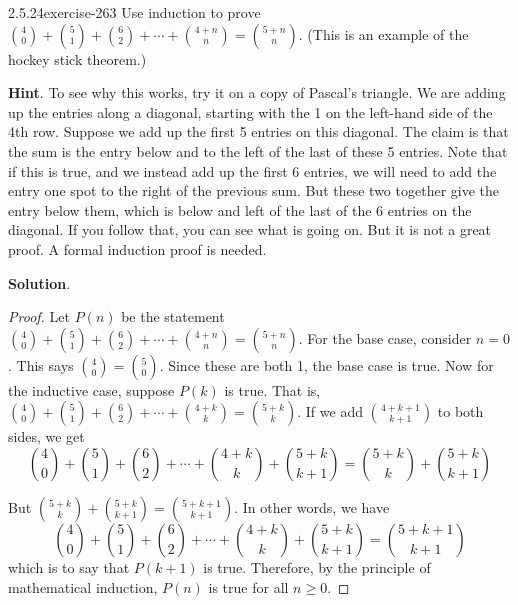 \documentclass[twoside,11pt,]{book}
\numberwithin{equation}{chapter}
\begin{document}
\begin{divisionsolution}{2.5.24}{}{exercise-263}%
\hypertarget{p-3685}{}%
Use induction to prove \({4 \choose 0} + {5 \choose 1} + {6 \choose 2} + \cdots + {4+n \choose n} = {5+n \choose n}\). (This is an example of the hockey stick theorem.)%
\par\smallskip%
\noindent\textbf{Hint}.\quad%
\hypertarget{p-3686}{}%
To see why this works, try it on a copy of Pascal's triangle. We are adding up the entries along a diagonal, starting with the 1 on the left-hand side of the 4th row. Suppose we add up the first 5 entries on this diagonal. The claim is that the sum is the entry below and to the left of the last of these 5 entries. Note that if this is true, and we instead add up the first 6 entries, we will need to add the entry one spot to the right of the previous sum. But these two together give the entry below them, which is below and left of the last of the 6 entries on the diagonal. If you follow that, you can see what is going on. But it is not a great proof. A formal induction proof is needed.%
\par\smallskip%
\noindent\textbf{Solution}.\quad%
\begin{proof}{}
\hypertarget{p-3687}{}%
Let \(P(n)\) be the statement \({4 \choose 0} + {5 \choose 1} + {6 \choose 2} + \cdots + {4+n \choose n} = {5+n \choose n}\). For the base case, consider \(n = 0\). This says \({4 \choose 0} = {5 \choose 0}\). Since these are both 1, the base case is true. Now for the inductive case, suppose \(P(k)\) is true. That is, \({4 \choose 0} + {5 \choose 1} + {6 \choose 2} + \cdots + {4+k \choose k} = {5+k \choose k}\). If we add \({4+k+1 \choose k+1}\) to both sides, we get%
\begin{equation*}
{4 \choose 0} + {5 \choose 1} + {6 \choose 2} + \cdots + {4+k \choose k} + {5+k \choose k+1}= {5+k \choose k} + {5+k \choose k+1}
\end{equation*}
%
\par
\hypertarget{p-3688}{}%
But \({5+k \choose k} + {5+k \choose k+1} = {5+k+1 \choose k+1}\). In other words, we have%
\begin{equation*}
{4 \choose 0} + {5 \choose 1} + {6 \choose 2} + \cdots + {4+k \choose k} + {5+k \choose k+1} = {5+k+1 \choose k+1}
\end{equation*}
which is to say that \(P(k+1)\) is true. Therefore, by the principle of mathematical induction, \(P(n)\) is true for all \(n \ge 0\).%
\end{proof}
\end{divisionsolution}%
\end{document}
